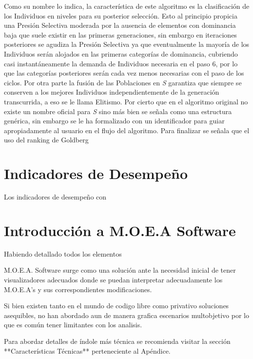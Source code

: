 \documentclass[class=report, crop=false]{standalone}
\begin{document}
Como su nombre lo indica, la característica de este algoritmo es 
la clasificación de los Individuos en niveles para su posterior 
selección.\break
Esto al principio propicia una Presión Selectiva moderada por 
la ausencia de elementos con dominancia baja que suele existir 
en las primeras generaciones, sin embargo en iteraciones posteriores 
se agudiza la Presión Selectiva ya que eventualmente la mayoría de 
los Individuos serán alojados en las primeras categorías de dominancia, 
cubriendo casi instantáneamente la demanda de Individuos necesaria en 
el paso 6, por lo que las categorías posteriores serán cada vez 
menos necesarias con el paso de los ciclos.\medskip\break
Por otra parte la fusión de las Poblaciones en \emph{S} garantiza 
que siempre se conserven a los mejores Individuos independientemente 
de la generación transcurrida, a eso se le llama Elitismo.\break
Por cierto que en el algoritmo original no existe un nombre oficial 
para \emph{S} sino más bien se señala como una estructura genérica, 
sin embargo se le ha formalizado con un identificador para guiar 
apropiadamente al usuario en el flujo del algoritmo.\medskip\break
Para finalizar se señala que el uso del ranking de Goldberg 



\section{Indicadores de Desempeño}

Los indicadores de desempeño con 	
\section{Introducción a M.O.E.A Software}
Habiendo detallado todos los elementos 

M.O.E.A. Software surge como una solución ante la necesidad inicial de tener visualizadores adecuados donde se puedan interpretar
adecuadamente los M.O.E.A's y sus correspondientes modificaciones.

Si bien existen tanto en el mundo de codigo libre como privativo soluciones asequibles, no han abordado aun de manera grafica
escenarios multobjetivo por lo que es común tener limitantes con los analisis.

Para abordar detalles de índole más técnica se recomienda visitar la sección **Características Técnicas** perteneciente al Apéndice.

\label{sec:p_1}    

\end{document}
